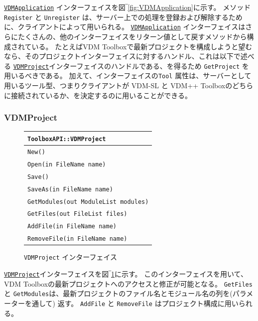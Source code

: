 \documentclass[\pformat,12pt]{jarticle}
\newcommand{\VDMApplication}{\hyperlink{interface.VDMApplication}{VDMApplication}}
\newcommand{\VDMProject}{\hyperlink{interface.VDMProject}{VDMProject}}
\begin{document}
 {\tt \VDMApplication} インターフェイスを図‾\ref{fig:VDMApplication}に示す。  
メソッド {\tt Register} と {\tt  Unregister} は、サーバー上での処理を登録および解除するために、クライアントによって用いられる。
 {\tt \VDMApplication} インターフェイスはさらにたくさんの、他のインターフェイスをリターン値として戻すメソッドから構成されている。
たとえばVDM Toolboxで最新プロジェクトを構成しようと望むなら、そのプロジェクトインターフェイスに対するハンドル、これは以下で述べる {\tt \VDMProject}インターフェイスのハンドルである、を得るため {\tt GetProject} を用いるべきである。
加えて、インターフェイスの{\tt Tool} 属性は、サーバーとして用いるツール型、つまりクライアントが VDM-SL と VDM++ Toolboxのどちらに接続されているか、を決定するのに用いることができる。

\subsubsection{VDMProject}


\begin{figure}[tbh]
\begin{center}
\begin{tabular}{|l|}
\hline
{\tt ToolboxAPI::VDMProject } \\
\hline
{\tt New() } \\
{\tt Open(in FileName name) } \\
{\tt Save() } \\
{\tt SaveAs(in FileName name) } \\
{\tt GetModules(out ModuleList modules)} \\
{\tt GetFiles(out FileList files)} \\
{\tt AddFile(in FileName name)} \\
{\tt RemoveFile(in FileName name)} \\
\hline
\end{tabular}
\caption{{\tt VDMProject} インターフェイス}\label{fig:VDMProject}
\end{center}
\end{figure}

 {\tt \VDMProject}インターフェイスを図‾\ref{fig:VDMProject}に示す。
このインターフェイスを用いて、VDM Toolboxの最新プロジェクトへのアクセスと修正が可能となる。 
{\tt GetFiles} と {\tt GetModules}は、最新プロジェクトのファイル名とモジュール名の列を(パラメーターを通して) 返す。
{\tt  AddFile} と {\tt RemoveFile} はプロジェクト構成に用いられる。
\end{document}

